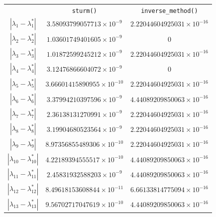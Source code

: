 \documentclass[UTF8,a4paper,10pt]{ctexart}
\begin{document}
        \begin{table}[h!]%
            \centering
            \label{tab:1}  
            \begin{tabular}{ccc}%
                \hline\hline\noalign{\smallskip}	
                \  & \texttt{sturm()} & \texttt{inverse\_method()} \\
                \noalign{\smallskip}\hline\noalign{\smallskip}
                $\left|\lambda_1-\lambda_1^*\right|$ & $3.58093799057713\times 10^{-9}$ & $2.22044604925031\times 10^{-16}$ \\
                $\left|\lambda_2-\lambda_2^*\right|$ & $1.03601749401605\times 10^{-9}$ & $0$ \\
                $\left|\lambda_3-\lambda_3^*\right|$ & $1.01872599245212\times 10^{-9}$ & $2.22044604925031\times 10^{-16}$ \\
                $\left|\lambda_4-\lambda_4^*\right|$ & $3.12476866604072\times 10^{-9}$ & $0$ \\
                $\left|\lambda_5-\lambda_5^*\right|$ & $3.66601415890955\times 10^{-10}$ & $2.22044604925031\times 10^{-16}$ \\
                $\left|\lambda_6-\lambda_6^*\right|$ & $3.37994210397596\times 10^{-9}$ & $4.44089209850063\times 10^{-16}$ \\
                $\left|\lambda_7-\lambda_7^*\right|$ & $2.36138131270991\times 10^{-9}$ & $2.22044604925031\times 10^{-16}$ \\
                $\left|\lambda_8-\lambda_8^*\right|$ & $3.19904680523564\times 10^{-9}$ & $2.22044604925031\times 10^{-16}$ \\
                $\left|\lambda_9-\lambda_9^*\right|$ & $8.97356855489306\times 10^{-10}$ & $2.22044604925031\times 10^{-16}$ \\
                $\left|\lambda_{10}-\lambda_{10}^*\right|$ & $4.22189394555517\times 10^{-10}$ & $4.44089209850063\times 10^{-16}$ \\
                $\left|\lambda_{11}-\lambda_{11}^*\right|$ & $2.45831932588203\times 10^{-9}$ & $4.44089209850063\times 10^{-16}$ \\
                $\left|\lambda_{12}-\lambda_{12}^*\right|$ & $8.49618153608844\times 10^{-11}$ & $6.66133814775094\times 10^{-16}$ \\
                $\left|\lambda_{13}-\lambda_{13}^*\right|$ & $9.56702717047619\times 10^{-10}$ & $4.44089209850063\times 10^{-16}$ \\

\end{tabular}
\end{table}
\end{document}
